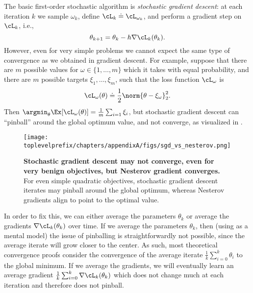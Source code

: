 \documentclass[../../book-main.tex]{subfiles}
\begin{document}
The basic first-order stochastic algorithm is \textit{stochastic gradient descent}: at each iteration \(k\) we sample \(\omega_{k}\), define \(\cL_{k} \doteq \cL_{\omega_{k}}\), and perform a gradient step on \(\cL_{k}\), i.e.,
\begin{equation}
    \theta_{k + 1} = \theta_{k} - h\nabla \cL_{k}(\theta_{k}).
\end{equation}
However, even for very simple problems we cannot expect the same type of convergence as we obtained in gradient descent. For example, suppose that there are \(m\) possible values for \(\omega \in \{1, \dots, m\}\) which it takes with equal probability, and there are \(m\) possible targets \(\xi_{1}, \dots, \xi_{m}\), such that the loss function \(\cL_{\omega}\) is
\begin{equation}
    \cL_{\omega}(\theta) \doteq \frac{1}{2}\norm{\theta - \xi_{\omega}}_{2}^{2}.
\end{equation}
Then \(\argmin_{\theta}\Ex[\cL_{\omega}(\theta)] = \frac{1}{m}\sum_{i = 1}\xi_{i}\), but stochastic gradient descent can ``pinball'' around the global optimum value, and not converge, as visualized in . 

\begin{figure}
    \texttt{[image: \\toplevelprefix/chapters/appendixA/figs/sgd\_vs\_nesterov.png]}
    \centering 
    \caption{\small\textbf{Stochastic gradient descent may not converge, even for very benign objectives, but Nesterov gradient converges.} For even simple quadratic objectives, stochastic gradient descent iterates may pinball around the global optimum, whereas Nesterov gradients align to point to the optimal value.}
    \label{fig:sgd_nonconvergence}
\end{figure}

In order to fix this, we can either average the parameters \(\theta_{k}\) or average the gradients \(\nabla \cL_{k}(\theta_{k})\) over time. If we average the parameters \(\theta_{k}\), then (using  as a mental model) the issue of pinballing is straightforwardly not possible, since the average iterate will grow closer to the center. As such, most theoretical convergence proofs consider the convergence of the average iterate \(\frac{1}{k}\sum_{i = 0}^{k}\theta_{i}\) to the global minimum. If we average the gradients, we will eventually learn an average gradient \(\frac{1}{k}\sum_{i = 0}^{k}\nabla \cL_{k}(\theta_{k})\) which does not change much at each iteration and therefore does not pinball.
\end{document}
